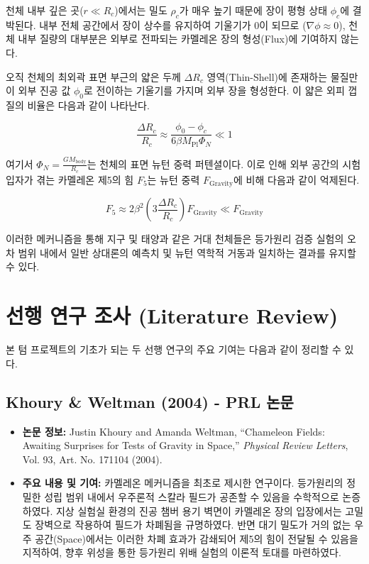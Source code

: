 \documentclass[11pt, a4paper]{article}
\begin{document}
천체 내부 깊은 곳($r \ll R_c$)에서는 밀도 $\rho_c$가 매우 높기 때문에 장이 평형 상태 $\phi_c$에 결박된다. 내부 전체 공간에서 장이 상수를 유지하여 기울기가 0이 되므로 ($\nabla \phi \approx 0$), 천체 내부 질량의 대부분은 외부로 전파되는 카멜레온 장의 형성(Flux)에 기여하지 않는다.

오직 천체의 최외곽 표면 부근의 얇은 두께 $\Delta R_c$ 영역(Thin-Shell)에 존재하는 물질만이 외부 진공 값 $\phi_0$로 전이하는 기울기를 가지며 외부 장을 형성한다. 이 얇은 외피 껍질의 비율은 다음과 같이 나타난다.

\begin{equation}
    \frac{\Delta R_c}{R_c} \approx \frac{\phi_0 - \phi_c}{6 \beta M_{\text{Pl}} \Phi_N} \ll 1
\end{equation}

여기서 $\Phi_N = \frac{G M_{\text{body}}}{R_c}$는 천체의 표면 뉴턴 중력 퍼텐셜이다. 이로 인해 외부 공간의 시험 입자가 겪는 카멜레온 제5의 힘 $F_5$는 뉴턴 중력 $F_{\text{Gravity}}$에 비해 다음과 같이 억제된다.

\begin{equation}
    F_5 \approx 2 \beta^2 \left( 3\frac{\Delta R_c}{R_c} \right) F_{\text{Gravity}} \ll F_{\text{Gravity}}
\end{equation}

이러한 메커니즘을 통해 지구 및 태양과 같은 거대 천체들은 등가원리 검증 실험의 오차 범위 내에서 일반 상대론의 예측치 및 뉴턴 역학적 거동과 일치하는 결과를 유지할 수 있다.

\section{선행 연구 조사 (Literature Review)}

본 텀 프로젝트의 기초가 되는 두 선행 연구의 주요 기여는 다음과 같이 정리할 수 있다.

\subsection{Khoury \& Weltman (2004) - PRL 논문}
\begin{itemize}
    \item \textbf{논문 정보:} Justin Khoury and Amanda Weltman, ``Chameleon Fields: Awaiting Surprises for Tests of Gravity in Space,'' \textit{Physical Review Letters}, Vol. 93, Art. No. 171104 (2004)\cite{Khoury2004prl}.
    \item \textbf{주요 내용 및 기여:} 
    카멜레온 메커니즘을 최초로 제시한 연구이다. 등가원리의 정밀한 성립 범위 내에서 우주론적 스칼라 필드가 공존할 수 있음을 수학적으로 논증하였다.
    지상 실험실 환경의 진공 챔버 용기 벽면이 카멜레온 장의 입장에서는 고밀도 장벽으로 작용하여 필드가 차폐됨을 규명하였다. 반면 대기 밀도가 거의 없는 우주 공간(Space)에서는 이러한 차폐 효과가 감쇄되어 제5의 힘이 전달될 수 있음을 지적하여, 향후 위성을 통한 등가원리 위배 실험의 이론적 토대를 마련하였다.
\end{itemize}
\end{document}
